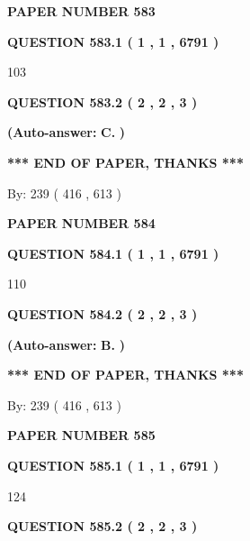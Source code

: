 \documentclass{ctexart}
\begin{document}
   
\newpage 
\setcounter{page}{ 
   583001 } 
   
   
 {\textbf{ \Large{ PAPER NUMBER  583  }}}
   
   
   
   
  
  
{\textbf{\large{QUESTION
583.1 
 ( 1 , 1 , 6791 )
}}}

103
  
  
{\textbf{\large{QUESTION
583.2 
 ( 2 , 2 , 3 )
}}}
 
 
{\textbf{(Auto-answer:}}
{\textbf{\large{
C.}}}
{\textbf{)}}
 
 
   
   
   
   
\vspace{1.0in} 
{\textbf{\large{ *** END OF PAPER, THANKS *** }}} 
   
   
\hspace{1.0in} By: 
 239 ( 416 ,  613 )
   
   
   
   
\newpage 
\setcounter{page}{ 
   584001 } 
   
   
 {\textbf{ \Large{ PAPER NUMBER  584  }}}
   
   
   
   
  
  
{\textbf{\large{QUESTION
584.1 
 ( 1 , 1 , 6791 )
}}}

110
  
  
{\textbf{\large{QUESTION
584.2 
 ( 2 , 2 , 3 )
}}}
 
 
{\textbf{(Auto-answer:}}
{\textbf{\large{
B.}}}
{\textbf{)}}
 
 
   
   
   
   
\vspace{1.0in} 
{\textbf{\large{ *** END OF PAPER, THANKS *** }}} 
   
   
\hspace{1.0in} By: 
 239 ( 416 ,  613 )
   
   
   
   
\newpage 
\setcounter{page}{ 
   585001 } 
   
   
 {\textbf{ \Large{ PAPER NUMBER  585  }}}
   
   
   
   
  
  
{\textbf{\large{QUESTION
585.1 
 ( 1 , 1 , 6791 )
}}}

124
  
  
{\textbf{\large{QUESTION
585.2 
 ( 2 , 2 , 3 )
}}}
 
\end{document}
